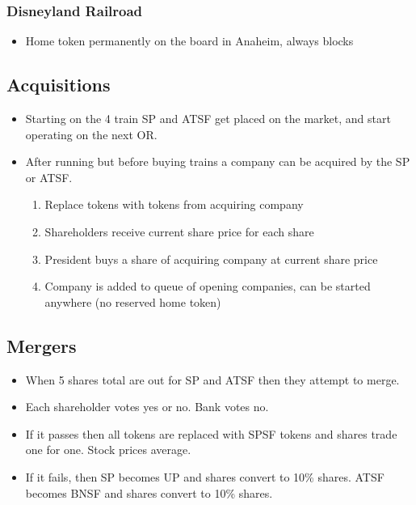 \documentclass[letterpaper]{article}
\begin{document}
\begin{multicols}{2}
    \subsubsection*{Disneyland Railroad}
    \begin{itemize}
    \item Home token permanently on the board in Anaheim, always blocks
    \end{itemize}

    \subsection*{Acquisitions}

    \begin{itemize}
    \item Starting on the 4 train SP and ATSF get placed on the market, and
        start operating on the next OR.
    \item After running but before buying trains a company can be acquired by
        the SP or ATSF.
        \begin{enumerate}
        \item Replace tokens with tokens from acquiring company
        \item Shareholders receive current share price for each share
        \item President buys a share of acquiring company at current share price
        \item Company is added to queue of opening companies, can be started
            anywhere (no reserved home token)
        \end{enumerate}
    \end{itemize}

    \subsection*{Mergers}

    \begin{itemize}
    \item When 5 shares total are out for SP and ATSF then they attempt to merge.
    \item Each shareholder votes yes or no. Bank votes no.
    \item If it passes then all tokens are replaced with SPSF tokens and shares
        trade one for one. Stock prices average.
    \item If it fails, then SP becomes UP and shares convert to 10\%
        shares. ATSF becomes BNSF and shares convert to 10\% shares.
    \end{itemize}
\end{multicols}
\end{document}
